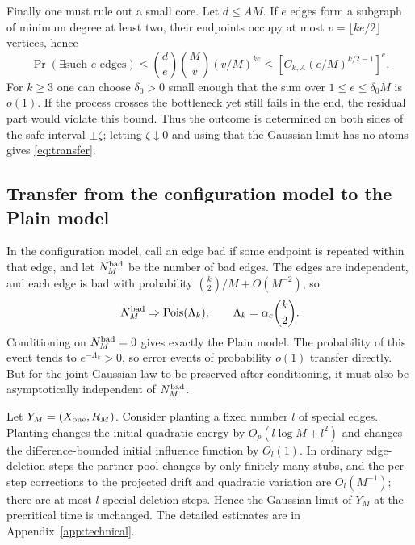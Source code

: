 Finally one must rule out a small core. Let $d\le AM$. If $e$ edges form a subgraph of minimum degree at
least two, their endpoints occupy at most $v=\lfloor ke/2\rfloor$ vertices, hence
\begin{equation*}
\Pr(\exists\text{such }e\text{ edges})
\le \binom{d}{e}\binom{M}{v}(v/M)^{ke}
\le[C_{k,A}(e/M)^{k/2-1}]^e.
\end{equation*}
For $k\ge3$ one can choose $\delta_0>0$ small enough that the sum over $1\le e\le\delta_0M$ is $o(1)$. If
the process crosses the bottleneck yet still fails in the end, the residual part would violate this bound.
Thus the outcome is determined on both sides of the safe interval $\pm\zeta$; letting $\zeta\downarrow0$ and
using that the Gaussian limit has no atoms gives \eqref{eq:transfer}.

\subsection{Transfer from the configuration model to the Plain model}\label{sec:mp-plain}
In the configuration model, call an edge bad if some endpoint is repeated within that edge, and let
$N^{\rm bad}_M$ be the number of bad edges. The edges are independent, and each edge is bad with probability
$\binom{k}{2}/M+O(M^{-2})$, so
\begin{equation*}
N^{\rm bad}_M\Rightarrow\operatorname{Pois}(\Lambda_k),\qquad
\Lambda_k=\alpha_c\binom{k}{2}.
\end{equation*}
Conditioning on $N^{\rm bad}_M=0$ gives exactly the Plain model. The probability of this event tends to
$e^{-\Lambda_k}>0$, so error events of probability $o(1)$ transfer directly. But for the joint Gaussian law
to be preserved after conditioning, it must also be asymptotically independent of $N^{\rm bad}_M$.

Let $Y_M=(X_{\rm one},R_M)$. Consider planting a fixed number $l$ of special edges. Planting changes the
initial quadratic energy by $O_p(l\log M+l^2)$ and changes the difference-bounded initial influence function
by $O_l(1)$. In ordinary edge-deletion steps the partner pool changes by only finitely many stubs, and the
per-step corrections to the projected drift and quadratic variation are $O_l(M^{-1})$; there are at most $l$
special deletion steps. Hence the Gaussian limit of $Y_M$ at the precritical time is unchanged. The detailed
estimates are in Appendix~\ref{app:technical}.

